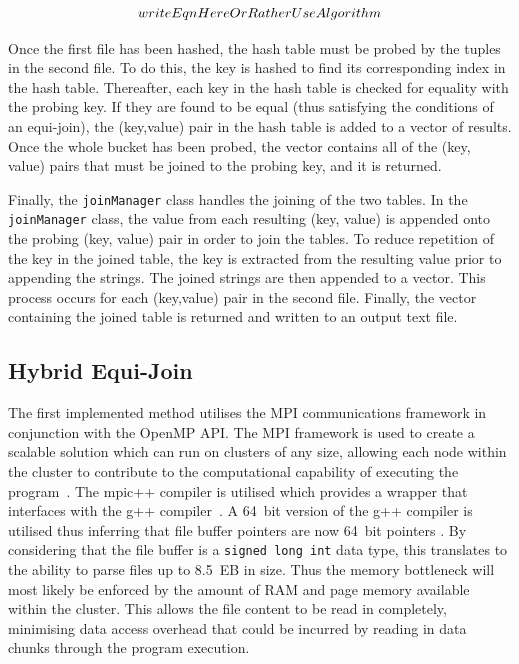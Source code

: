 \documentclass[10pt,twocolumn]{witseiepaper}
\begin{document}
\begin{equation}
 writeEqnHereOrRatherUseAlgorithm\\
\label{eqn:hash}
\end{equation}

Once the first file has been hashed, the hash table must be probed by the tuples in the second file. To do this, the key is hashed to find its corresponding index in the hash table. Thereafter, each key in the hash table is checked for equality with the probing key. If they are found to be equal (thus satisfying the conditions of an equi-join), the (key,value) pair in the hash table is added to a vector of results. Once the whole bucket has been probed, the vector contains all of the (key, value) pairs that must be joined to the probing key, and it is returned.

Finally, the \texttt{joinManager} class handles the joining of the two tables. In the \texttt{joinManager} class, the value from each resulting (key, value) is appended onto the probing (key, value) pair in order to join the tables. To reduce repetition of the key in the joined table, the key is extracted from the resulting value prior to appending the strings. The joined strings are then appended to a vector. This process occurs for each (key,value) pair in the second file. Finally, the vector containing the joined table is returned and written to an output text file.

\subsection{Hybrid Equi-Join}
The first implemented method utilises the MPI communications framework in conjunction with the OpenMP API. The MPI framework is used to create a scalable solution which can run on clusters of any size, allowing each node within the cluster to contribute to the computational capability of executing the program~\cite{mpi-scale}. The mpic++ compiler is utilised which provides a wrapper that interfaces with the g++ compiler~\cite{mpic++-wrapper}. A 64~bit version of the g++ compiler is utilised thus inferring that file buffer pointers are now 64~bit pointers \cite{pointer-size}. By considering that the file buffer is a \texttt{signed long int} data type, this translates to the ability to parse files up to 8.5~EB in size. Thus the memory bottleneck will most likely be enforced by the amount of RAM and page memory available within the cluster. This allows the file content to be read in completely, minimising data access overhead that could be incurred by reading in data chunks through the program execution.
\end{document}
